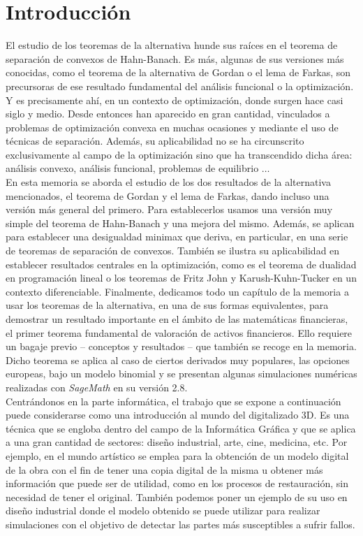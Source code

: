 \chapter{Introducción}
El estudio de los teoremas de la alternativa hunde sus raíces en el teorema de separación de convexos de Hahn-Banach. Es más, algunas de sus versiones más conocidas, como el teorema de la alternativa de Gordan o el lema de Farkas, son precursoras de ese resultado fundamental del análisis funcional o la optimización. Y es precisamente ahí, en un contexto de optimización, donde surgen hace casi siglo y medio. Desde entonces han aparecido en gran cantidad, vinculados a problemas de optimización convexa en muchas ocasiones y mediante el uso de técnicas de separación. Además, su aplicabilidad no se ha circunscrito exclusivamente al campo de la optimización sino que ha transcendido dicha área: análisis convexo, análisis funcional, problemas de equilibrio $ \dots $ \\

En esta memoria se aborda el estudio de los dos resultados de la alternativa mencionados, el teorema de Gordan y el lema de Farkas, dando incluso una versión más general del primero. Para establecerlos usamos una versión muy simple del teorema de Hahn-Banach y una mejora del mismo. Además, se aplican para establecer una desigualdad minimax que deriva, en particular, en una serie de teoremas de separación de convexos. También se ilustra su aplicabilidad en establecer resultados centrales en la optimización, como es el teorema de dualidad en programación lineal o los teoremas de Fritz John y Karush-Kuhn-Tucker en un contexto diferenciable. Finalmente, dedicamos todo un capítulo de la memoria a usar los teoremas de la alternativa, en una de sus formas equivalentes, para demostrar un resultado importante en el ámbito de las matemáticas financieras, el primer teorema fundamental de valoración de activos financieros. Ello requiere un bagaje previo -- conceptos y resultados -- que también se recoge en la memoria. Dicho teorema se aplica al caso de ciertos derivados muy populares, las opciones europeas, bajo un modelo binomial y se presentan algunas simulaciones numéricas realizadas con \textit{SageMath} en su versión 2.8. \\

Centrándonos en la parte informática, el trabajo que se expone a continuación puede considerarse como una introducción al mundo del digitalizado 3D. Es una técnica que se engloba dentro del campo de la Informática Gráfica y que se aplica a una gran cantidad de sectores: diseño industrial, arte, cine, medicina, etc. Por ejemplo, en el mundo artístico se emplea para la obtención de un modelo digital de la obra con el fin de tener una copia digital de la misma u obtener más información que puede ser de utilidad, como en los procesos de restauración, sin necesidad de tener el original. También podemos poner un ejemplo de su uso en diseño industrial donde el modelo obtenido se puede utilizar para realizar simulaciones con el objetivo de detectar las partes más susceptibles a sufrir fallos. \\

